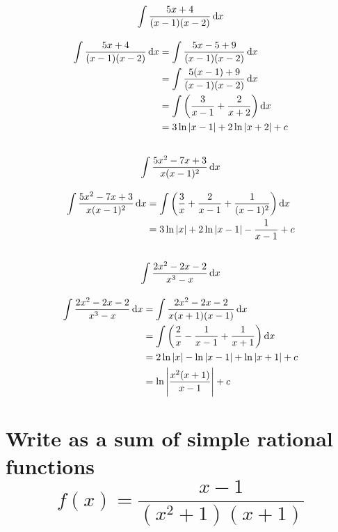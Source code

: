\documentclass[fleqn, a4paper]{article}
\begin{document}
\subsection{\[\int \dfrac{5x + 4}{(x-1)(x-2)}\dif x\]}

\begin{align*}
	\int \dfrac{5x + 4}{(x-1)(x-2)}\dif x &= \int \dfrac{5x -5 + 9}{(x-1)(x-2)}\dif x\\
	&= \int \dfrac{5(x - 1) + 9}{(x-1)(x-2)}\dif x\\
	&= \int \left( \dfrac{3}{x - 1} + \dfrac{2}{x + 2} \right) \dif x\\
	&= 3 \ln |x - 1| + 2 \ln |x + 2| + c
\end{align*}

\subsection{\[\int \dfrac{5x^2 - 7x + 3}{x(x - 1)^2} \dif x\]}

\begin{align*}
	\int \dfrac{5x^2 - 7x + 3}{x(x - 1)^2} \dif x &= \int \left( \dfrac{3}{x} + \dfrac{2}{x - 1} + \dfrac{1}{(x - 1)^2} \right)\dif x\\
	&= 3 \ln |x| + 2 \ln |x - 1| - \dfrac{1}{x - 1} + c 
\end{align*}

\subsection{\[\int \dfrac{2x^2 - 2x - 2}{x^3 - x} \dif x\]}

\begin{align*}
	\int \dfrac{2x^2 - 2x - 2}{x^3 - x} \dif x &= \int \dfrac{2x^2 - 2x - 2}{x (x + 1)(x - 1)} \dif x\\
	&= \int \left( \dfrac{2}{x} - \dfrac{1}{x - 1} + \dfrac{1}{x + 1} \right) \dif x\\
	&= 2 \ln |x| - \ln |x - 1| + \ln |x + 1| + c\\
	&= \ln \left\lvert \dfrac{x^2(x+1)}{x - 1} \right\rvert + c
\end{align*}

\section{Write as a sum of simple rational functions \[f(x) = \dfrac{x - 1}{(x^2 + 1)(x + 1)}\]}
\end{document}

